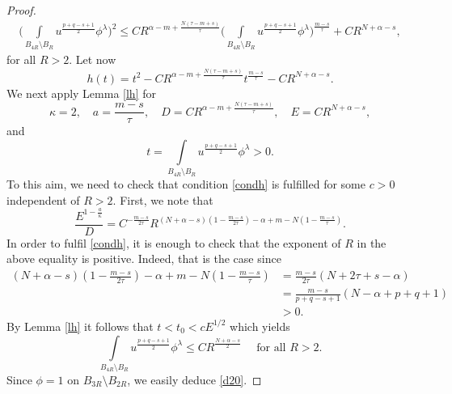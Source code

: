 \documentclass[10pt,a4paper]{amsart}
\numberwithin{equation}{section}
\begin{document}
\begin{proof}
\begin{equation}
\begin{aligned}
\Big(\int\limits_{B_{4R}\setminus B_R} u^{\frac{p+q-s+1}{2}}\phi^\lambda \Big)^2
\leq 
CR^{\alpha-m+\frac{N(\tau-m+s)}{\tau}} \Big(\int\limits_{B_{4R}\setminus B_R} u^{\frac{p+q-s+1}{2}}\phi^{\lambda}\Big)^{\frac{m-s}{\tau}}+CR^{N+\alpha-s},
\end{aligned}
\end{equation}
for all $R>2$. Let now
$$
h(t)=t^2-CR^{\alpha-m+\frac{N(\tau-m+s)}{\tau}} t^{\frac{m-s}{\tau}}-CR^{N+\alpha-s}.
$$
We next apply Lemma \ref{lh} for 
$$
\kappa=2,\quad a=\frac{m-s}{\tau},\quad D=CR^{\alpha-m+\frac{N(\tau-m+s)}{\tau}}, \quad E=CR^{N+\alpha-s},
$$
and
$$
t=\int\limits_{B_{4R}\setminus B_R} u^{\frac{p+q-s+1}{2}}\phi^\lambda>0.
$$
To this aim, we need to check that condition \eqref{condh} is fulfilled for some $c>0$ independent of $R>2$. First, we note that
$$
\frac{E^{1-\frac{a}{\kappa}}}{D}=C^{-\frac{m-s}{2\tau}} R^{(N+\alpha-s)(1-\frac{m-s}{2\tau})-\alpha+m-N(1-\frac{m-s}{\tau})}.
$$
In order to fulfil \eqref{condh}, it is enough to check that the exponent of $R$ in the above equality is positive. Indeed, that is the case since
$$
\begin{aligned}
(N+\alpha-s)(1-\frac{m-s}{2\tau})-\alpha+m-N(1-\frac{m-s}{\tau})
&=\frac{m-s}{2\tau}(N+2\tau+s-\alpha)\\
&=\frac{m-s}{p+q-s+1}(N-\alpha+p+q+1)\\
&>0.
\end{aligned}
$$
By Lemma \ref{lh} it follows that $t<t_0<cE^{1/2}$ which yields 
$$
\int\limits_{B_{4R}\setminus B_R} u^{\frac{p+q-s+1}{2}}\phi^\lambda \leq C R^{\frac{N+\alpha-s}{2}} \quad\mbox{ for all }R>2.
$$
Since $\phi=1$ on $B_{3R}\setminus B_{2R}$, we easily deduce \eqref{d20}.
\end{proof}
\end{document}
